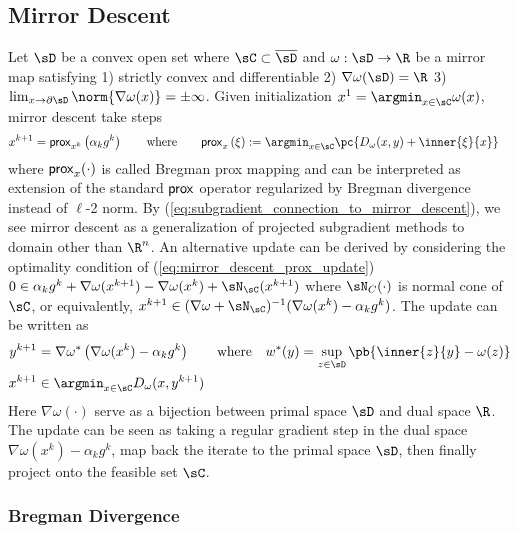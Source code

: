 \documentclass[../summary.tex]{subfiles}
\begin{document}

\subsection{Mirror Descent}

Let $\sD$ be a convex open set where $\sC\subset\overline{\sD}$ and $\omega:\sD\to\R$ be a mirror map satisfying 1) strictly convex and differentiable 2) $\nabla \omega(\sD) = \R$ 3) $\lim_{x\to\partial\sD} \norm{\nabla \omega(x)} = \pm\infty$. Given initialization $x^1 = \argmin_{x\in\sC} \omega(x)$, mirror descent take steps
\begin{align}
    x^{k+1}
        &= \prox_{x^k}\left( \alpha_k g^k \right)
    \qquad\text{where}\qquad
    \prox_{x}\left( \xi \right)
        := \argmin_{x\in\sC} \pc{
            D_{\omega}(x,y) + \inner{\xi}{x}
        }
        \label{eq:mirror_descent_prox_update}
\end{align}
where $\mathsf{prox}_{x}(\cdot)$ is called Bregman prox mapping and can be interpreted as extension of the standard $\mathsf{prox}$ operator regularized by Bregman divergence instead of $\ell$-2 norm. By (\ref{eq:subgradient_connection_to_mirror_descent}), we see mirror descent as a generalization of projected subgradient methods to domain other than $\R^n$. An alternative update can be derived by considering the optimality condition of (\ref{eq:mirror_descent_prox_update}) $0 \in \alpha_k g^k + \nabla \omega(x^{k+1}) - \nabla \omega(x^k) + \sN_{\sC}(x^{k+1})$ where $\sN_C(\cdot)$ is normal cone of $\sC$, or equivalently, $x^{k+1} \in (\nabla \omega + \sN_{\sC})^{-1}(\nabla \omega(x^k) - \alpha_k g^k)$. The update can be written as 
\begin{align*}
    y^{k+1}
        &= \nabla \omega^* \left( \nabla \omega(x^k) - \alpha_k g^k \right) 
        \qquad\text{where}\quad
        w^*(y) = \sup_{z\in\sD}\pb{\inner{z}{y} - \omega(z)}\\
    x^{k+1} 
        &\in \argmin_{x\in \sC} D_{\omega}(x,y^{k+1})
\end{align*}
Here $\nabla \omega(\cdot)$ serve as a bijection between primal space $\sD$ and dual space $\R$. The update can be seen as taking a regular gradient step in the dual space $\nabla \omega(x^k) - \alpha_k g^k$, map back the iterate to the primal space $\sD$, then finally project onto the feasible set $\sC$.


\subsubsection{Bregman Divergence}
\end{document}
